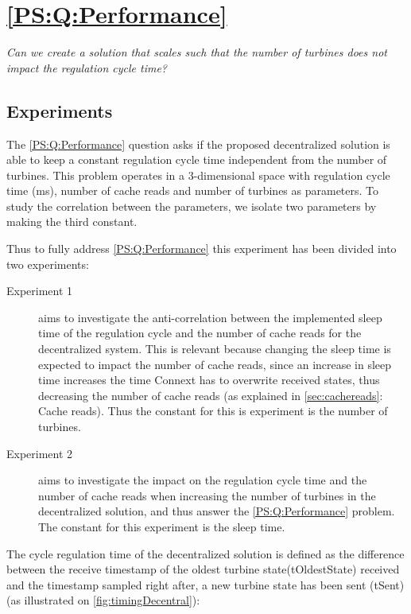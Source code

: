 
\section{\ref{PS:Q:Performance}}

\textit{Can we create a solution that scales such that the number of turbines does not impact the regulation cycle time?}

\subsection{Experiments}
\label{sec:Exper:perfom}


The \ref{PS:Q:Performance} question asks if the proposed decentralized solution is able to keep a constant regulation cycle time independent from the number of turbines. This problem operates in a 3-dimensional space with regulation cycle time (ms), number of cache reads and number of turbines as parameters. To study the correlation between the parameters, we isolate two parameters by making the third constant.

Thus to fully address \ref{PS:Q:Performance} this experiment has been divided into two experiments:
 
\begin{description}
	\item[Experiment 1] aims to investigate the anti-correlation between the implemented sleep time of the regulation cycle and the number of cache reads for the decentralized system. This is relevant because changing the sleep time is expected to impact the number of cache reads, since an increase in sleep time increases the time Connext has to overwrite received states, thus decreasing the number of cache reads (as explained in \cref{sec:cachereads}: Cache reads). Thus the constant for this is experiment is the number of turbines.
	\item[Experiment 2] aims to investigate the impact on the regulation cycle time and the number of cache reads when increasing the number of turbines in the decentralized solution, and thus answer the \ref{PS:Q:Performance} problem. The constant for this experiment is the sleep time.
\end{description}

The cycle regulation time of the decentralized solution is defined as the difference between the receive timestamp of the oldest turbine state(tOldestState) received and the timestamp sampled right after, a new turbine state has been sent (tSent) (as illustrated on \cref{fig:timingDecentral}):

